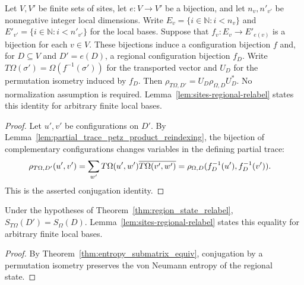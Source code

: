 \begin{theorem}
    \label{thm:region_state_relabel}
    \leanok
    Let $V,V'$ be finite sets of sites, let $e:V\to V'$ be a bijection,
    and let $n_v,n'_{v'}$ be nonnegative integer local dimensions.
    Write $E_v=\{i\in\mathbb N:i<n_v\}$ and
    $E'_{v'}=\{i\in\mathbb N:i<n'_{v'}\}$ for the local bases. Suppose that
    $f_v:E_v\to E'_{e(v)}$ is a bijection for each $v\in V$.
    These bijections induce a configuration bijection $f$ and, for
    $D\subseteq V$ and $D'=e(D)$, a regional configuration bijection $f_D$.
    Write $T\Omega(\sigma')=\Omega(f^{-1}(\sigma'))$ for the transported vector
    and $U_D$ for the permutation isometry induced by $f_D$. Then
    $\rho_{T\Omega,D'}=U_D\rho_{\Omega,D}U_D^*$.
    No normalization assumption is required.
    Lemma~\ref{lem:sites-regional-relabel} states this identity for arbitrary
    finite local bases.
\end{theorem}
\begin{proof}\leanok
    Let $u',v'$ be configurations on $D'$. By
    Lemma~\ref{lem:partial_trace_petz_product_reindexing}, the bijection of
    complementary configurations changes variables in the defining partial trace:
    \begin{align}
        \rho_{T\Omega,D'}(u',v')
         & =\sum_{w'}T\Omega(u',w')\overline{T\Omega(v',w')}
        =\rho_{\Omega,D}(f_D^{-1}(u'),f_D^{-1}(v')).\notag
    \end{align}
    This is the asserted conjugation identity.
\end{proof}

\begin{theorem}
    \label{thm:region_entropy_relabel}
    \leanok
    Under the hypotheses of Theorem~\ref{thm:region_state_relabel},
    $S_{T\Omega}(D')=S_\Omega(D)$.
    Lemma~\ref{lem:sites-regional-relabel} states this equality for arbitrary
    finite local bases.
\end{theorem}
\begin{proof}\leanok
    By Theorem~\ref{thm:entropy_submatrix_equiv}, conjugation by a permutation
    isometry preserves the von Neumann entropy of the regional state.
\end{proof}


